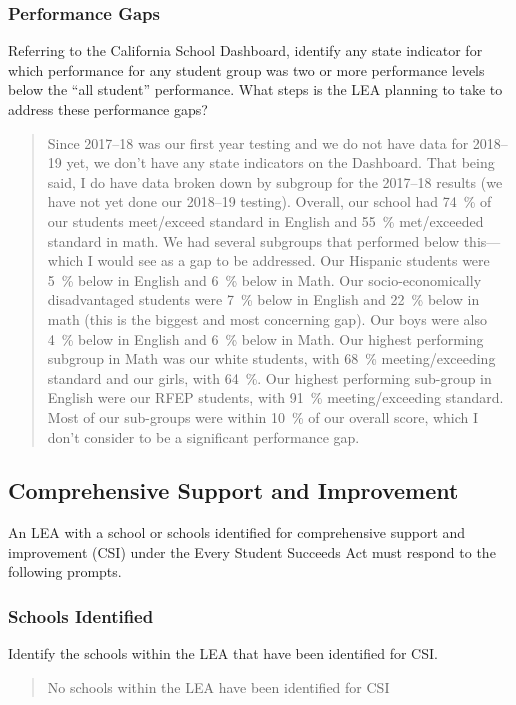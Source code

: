 \documentclass{article}
\begin{document}
\subsubsection{Performance Gaps}
Referring to the California School Dashboard, identify any state indicator for which performance for any student group was two or more performance levels below the ``all student'' performance. What steps is the LEA planning to take to address these performance gaps?
\begin{quotation}
	Since 2017--18 was our first year testing and we do not have data for 2018--19 yet, we don't have any state indicators on the Dashboard. That being said, I do have data broken down by subgroup for the 2017--18 results (we have not yet done our 2018--19 testing). Overall, our school had \SI{74}{\percent} of our students meet/exceed standard in English and \SI{55}{\percent} met/exceeded standard in math. We had several subgroups that performed below this---which I would see as a gap to be addressed. Our Hispanic students were \SI{5}{\percent} below in English and \SI{6}{\percent} below in Math. Our socio-economically disadvantaged students were \SI{7}{\percent} below in English and \SI{22}{\percent} below in math (this is the biggest and most concerning gap). Our boys were also \SI{4}{\percent} below in English and \SI{6}{\percent} below in Math. Our highest performing subgroup in Math was our white students, with \SI{68}{\percent} meeting/exceeding standard and our girls, with \SI{64}{\percent}. Our highest performing sub-group in English were our RFEP students, with \SI{91}{\percent} meeting/exceeding standard. Most of our sub-groups were within \SI{10}{\percent} of our overall score, which I don't consider to be a significant performance gap.
\end{quotation}

\subsection{Comprehensive Support and Improvement}
An LEA with a school or schools identified for comprehensive support and improvement (CSI) under the Every Student Succeeds Act must respond to the following prompts.

\subsubsection{Schools Identified}
Identify the schools within the LEA that have been identified for CSI.
\begin{quotation}
	No schools within the LEA have been identified for CSI
\end{quotation}
\end{document}
